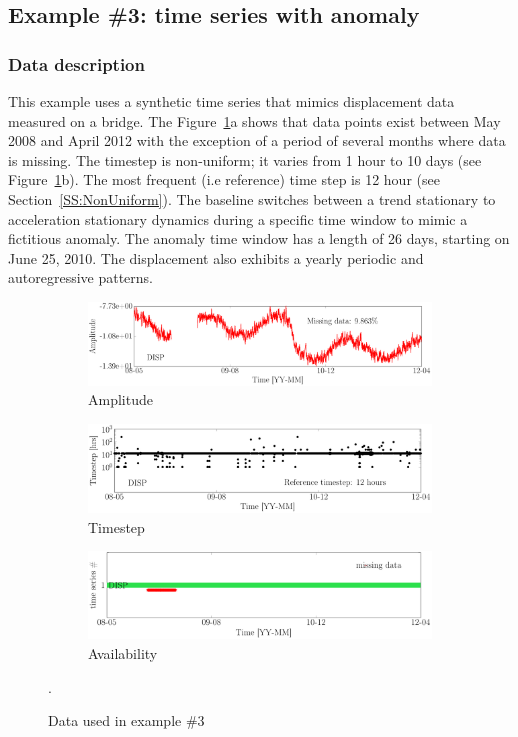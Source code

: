 \subsection{Example \#3: time series with anomaly}
\label{S:ExampleDispAnomaly}


\subsubsection{Data description}
This example uses a synthetic time series that mimics displacement data measured on a bridge. 
The Figure~\ref{fig:DataSummaryRaw3}a shows that data points exist between May 2008 and April 2012 with the exception of  a period of several months where data is missing.
The timestep is non-uniform; it varies from 1 hour to 10 days (see Figure~\ref{fig:DataSummaryRaw3}b). 
The most frequent (i.e reference) time step is 12 hour (see Section~\ref{SS:NonUniform}).
The baseline switches between a trend stationary to acceleration stationary dynamics during a specific time window to mimic a fictitious anomaly.
The anomaly time window has a length of 26 days, starting on June 25, 2010.
The displacement also exhibits a yearly periodic and autoregressive patterns.

\begin{figure}[h!]
\centering
\begin{subfigure}{\linewidth}
\includegraphics[width=0.95\linewidth]{./docfigs/Example_DISPSIM_ANOMALY/raw/ALL_AMPLITUDES.pdf} 
\caption{Amplitude}
\end{subfigure}
\begin{subfigure}{\linewidth}\centering
\includegraphics[width=0.9\linewidth]{./docfigs/Example_DISPSIM_ANOMALY/raw/ALL_TIMESTEPS.pdf}
\caption{Timestep}
\end{subfigure}
\begin{subfigure}{\linewidth}\centering
\includegraphics[width=0.9\linewidth]{./docfigs/Example_DISPSIM_ANOMALY/raw/AVAILABILITY.pdf}
\caption{Availability}
\end{subfigure}
\caption{Data used in example \#3}.
\label{fig:DataSummaryRaw3}
\end{figure}



